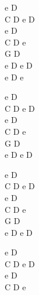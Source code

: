 \begin{chord}
    \small{
    e D\\
    C D e D\\
    e D\\
    C D e\\
    G D\\
    e D e D\\
    e D e

    e D\\
    C D e D\\
    e D\\
    C D e\\
    G D\\
    e D e D

    e D\\
    C D e D\\
    e D\\
    C D e\\
    G D\\
    e D e D

    e D\\
    C D e D\\
    e D\\
    C D e\\
    }
\end{chord}